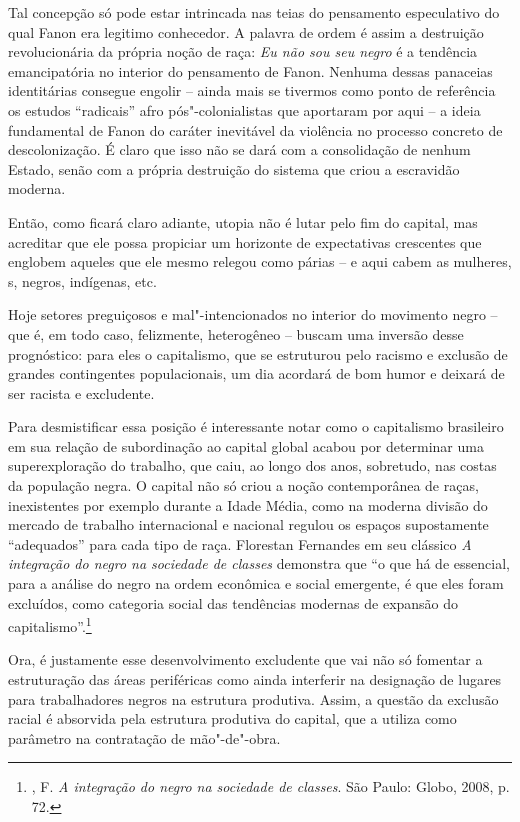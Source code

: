 Tal concepção só pode estar intrincada nas teias do pensamento
especulativo do qual Fanon era legitimo conhecedor. A palavra de ordem é
assim a destruição revolucionária da própria noção de raça: \emph{Eu não
sou seu negro} é a tendência emancipatória no interior do pensamento de
Fanon. Nenhuma dessas panaceias identitárias consegue engolir -- ainda
mais se tivermos como ponto de referência os estudos ``radicais'' afro
pós"-colonialistas que aportaram por aqui -- a ideia fundamental de Fanon
do caráter inevitável da violência no processo concreto de
descolonização. É claro que isso não se dará com a consolidação de
nenhum Estado, senão com a própria destruição do sistema que criou a
escravidão moderna.

Então, como ficará claro adiante, utopia não é lutar pelo fim do
capital, mas acreditar que ele possa propiciar um horizonte de
expectativas crescentes que englobem aqueles que ele mesmo relegou como
párias -- e aqui cabem as mulheres, s, negros, indígenas, etc.

Hoje setores preguiçosos e mal"-intencionados no interior do movimento
negro -- que é, em todo caso, felizmente, heterogêneo -- buscam uma
inversão desse prognóstico: para eles o capitalismo, que se estruturou
pelo racismo e exclusão de grandes contingentes populacionais, um dia
acordará de bom humor e deixará de ser racista e excludente.

Para desmistificar essa posição é interessante notar como o capitalismo
brasileiro em sua relação de subordinação ao capital global acabou por
determinar uma superexploração do trabalho, que caiu, ao longo dos anos,
sobretudo, nas costas da população negra. O capital não só criou a noção
contemporânea de raças, inexistentes por exemplo durante a Idade Média,
como na moderna divisão do mercado de trabalho internacional e nacional
regulou os espaços supostamente ``adequados'' para cada tipo de raça.
Florestan Fernandes em seu clássico \emph{A integração do negro na
sociedade de classes} demonstra que ``o que há de essencial, para a
análise do negro na ordem econômica e social emergente, é que eles foram
excluídos, como categoria social das tendências modernas de expansão do
capitalismo''.\footnote{, F. \emph{A integração do negro na
  sociedade de classes}. São Paulo: Globo, 2008, p. 72.}

Ora, é justamente esse desenvolvimento excludente que vai não só
fomentar a estruturação das áreas periféricas como ainda interferir na
designação de lugares para trabalhadores negros na estrutura produtiva.
Assim, a questão da exclusão racial é absorvida pela estrutura produtiva
do capital, que a utiliza como parâmetro na contratação de mão"-de"-obra.

